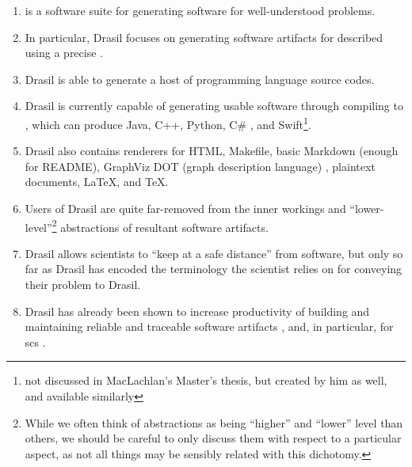 \begin{enumerate}

      \item {} is a
            software suite for generating software for well-understood problems.

      \item In particular, Drasil focuses on generating software artifacts for
             described using a precise .

      \item Drasil is able to generate a host of  programming language
            source codes.

      \item Drasil is currently capable of generating usable software through
            compiling to , which can produce Java, C++, Python, C\#
            \cite{MacLachlan2020}, and Swift\footnote{not discussed in
                  MacLachlan's Master's thesis, but created by him as well, and
                  available similarly}.

      \item Drasil also contains renderers for HTML, Makefile, basic Markdown
            (enough for README), GraphViz DOT (graph description language)
            \cite{Gansner1993}, plaintext documents, \LaTeX{}, and \TeX{}.

      \item Users of Drasil are quite far-removed from the inner workings and
            ``lower-level''\footnote{While we often think of abstractions as
                  being ``higher'' and ``lower'' level than others, we should be
                  careful to only discuss them with respect to a particular aspect, as
                  not all things may be sensibly related with this dichotomy.}
            abstractions of resultant software artifacts.

      \item Drasil allows scientists to ``keep at a safe distance'' from
            software, but only so far as Drasil has encoded the terminology the
            scientist relies on for conveying their problem to Drasil.

      \item Drasil has already been shown to increase productivity of building
            and maintaining reliable and traceable software artifacts
            \cite{SzymczakEtAl2016}, and, in particular, for \acs{scs}
            \cite{Smith2018}.


\end{enumerate}
